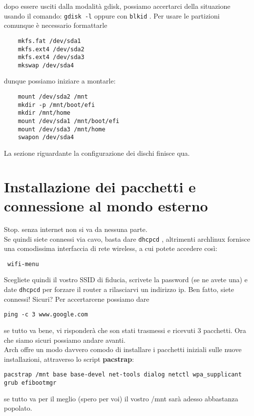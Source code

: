\documentclass[twoside,italian]{book}
\newcommand{\centcode}[1]{
	
	\definecolor{centcode}{rgb}{0.5,0.1,0.1}
	
	\begin{center}
	 	\texttt{\textcolor{centcode}{#1}}
	\end{center}
	
	
}
\newcommand{\code}[1]{
	\texttt{\textcolor{code}{#1}}
}
\begin{document}
			dopo essere usciti dalla modalità gdisk, possiamo accertarci della situazione usando il comando: \code{gdisk -l} oppure con \code{blkid}.
			Per usare le partizioni comunque è necessario formattarle\\


\begin{lstlisting}
	mkfs.fat /dev/sda1
	mkfs.ext4 /dev/sda2
	mkfs.ext4 /dev/sda3
	mkswap /dev/sda4
\end{lstlisting}



			dunque possiamo iniziare a montarle:


\begin{lstlisting}
	mount /dev/sda2 /mnt
	mkdir -p /mnt/boot/efi
	mkdir /mnt/home
	mount /dev/sda1 /mnt/boot/efi
	mount /dev/sda3 /mnt/home
	swapon /dev/sda4
\end{lstlisting}



			La sezione riguardante la configurazione dei dischi finisce qua.

		\section{Installazione dei pacchetti e connessione al mondo esterno}

			Stop. senza internet non si va da nessuna parte.\\

			Se quindi siete connessi via cavo, basta dare \code{dhcpcd}, altrimenti archlinux fornisce una comodissima interfaccia di rete wireless, a cui potete accedere così: \centcode{
				wifi-menu
			} Scegliete quindi il vostro SSID di fiducia, scrivete la password (se ne avete una) e date \code{dhcpcd} per forzare il router a rilasciarvi un indirizzo ip. Ben fatto, siete connessi! Sicuri? Per accertarcene possiamo dare \centcode{ping -c 3 www.google.com} se tutto va bene, vi risponderà che son stati trasmessi e ricevuti 3 pacchetti. Ora che siamo sicuri possiamo andare avanti.\\

			Arch offre un modo davvero comodo di installare i pacchetti iniziali sulle nuove installazioni, attraverso lo script \textbf{pacstrap}:\\
			\centcode{pacstrap /mnt base base-devel net-tools dialog netctl wpa\_supplicant grub efibootmgr}

			se tutto va per il meglio (spero per voi) il vostro /mnt sarà adesso abbastanza popolato.
\end{document}

